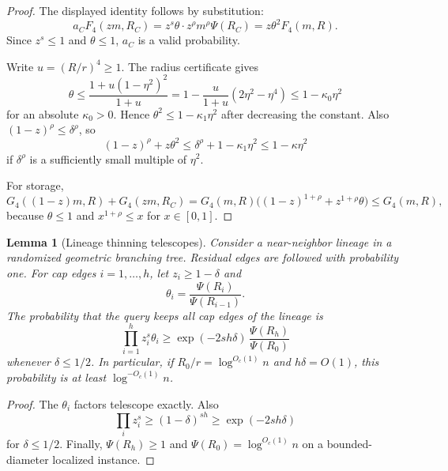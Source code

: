\documentclass[10pt]{article}
\newtheorem{lemma}[theorem]{Lemma}
\theoremstyle{definition}
\begin{document}
\begin{proof}
   The displayed identity follows by substitution:
   \[
      a_CF_4(zm,R_C)
      =
      z^s\theta\cdot z^\rho m^\rho\Psi(R_C)
      =
      z\theta^2F_4(m,R).
   \]
   Since $z^s\le1$ and $\theta\le1$, $a_C$ is a valid probability.

   Write $u=(R/r)^4\ge1$. The radius certificate gives
   \[
      \theta
      \le
      \frac{1+u(1-\eta^2)^2}{1+u}
      =
      1-\frac{u}{1+u}(2\eta^2-\eta^4)
      \le
      1-\kappa_0\eta^2
   \]
   for an absolute $\kappa_0>0$. Hence $\theta^2\le1-\kappa_1\eta^2$ after decreasing the constant. Also $(1-z)^\rho\le\delta^\rho$, so
   \[
      (1-z)^\rho+z\theta^2
      \le
      \delta^\rho+1-\kappa_1\eta^2
      \le
      1-\kappa\eta^2
   \]
   if $\delta^\rho$ is a sufficiently small multiple of $\eta^2$.

   For storage,
   \[
      G_4((1-z)m,R)+G_4(zm,R_C)
      =
      G_4(m,R)\bigl((1-z)^{1+\rho}+z^{1+\rho}\theta\bigr)
      \le
      G_4(m,R),
   \]
   because $\theta\le1$ and $x^{1+\rho}\le x$ for $x\in[0,1]$.
\end{proof}

\begin{lemma}[Lineage thinning telescopes]\label{lem:thin-lineage}
   Consider a near-neighbor lineage in a randomized geometric branching tree. Residual edges are followed with probability one. For cap edges $i=1,\ldots,h$, let $z_i\ge1-\delta$ and
   \[
      \theta_i=\frac{\Psi(R_i)}{\Psi(R_{i-1})}.
   \]
   The probability that the query keeps all cap edges of the lineage is
   \[
      \prod_{i=1}^h z_i^s\theta_i
      \ge
      \exp(-2sh\delta)\,
      \frac{\Psi(R_h)}{\Psi(R_0)}
   \]
   whenever $\delta\le1/2$. In particular, if $R_0/r=\log^{O_c(1)}n$ and $h\delta=O(1)$, this probability is at least $\log^{-O_c(1)}n$.
\end{lemma}

\begin{proof}
   The $\theta_i$ factors telescope exactly. Also
   \[
      \prod_i z_i^s
      \ge
      (1-\delta)^{sh}
      \ge
      \exp(-2sh\delta)
   \]
   for $\delta\le1/2$. Finally, $\Psi(R_h)\ge1$ and $\Psi(R_0)=\log^{O_c(1)}n$ on a bounded-diameter localized instance.
\end{proof}
\end{document}
